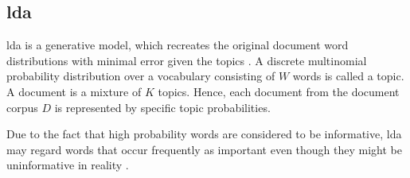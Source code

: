 
\subsection{\ac{lda}}\label{subsec:latent-dirichlet-allocation}

\ac{lda} is a generative model, which recreates the original document word distributions with minimal error given the topics \cite{topic_modeling2015, Top2Vec2020}.
A discrete multinomial probability distribution over a vocabulary consisting of $W$ words is called a topic.
A document is a mixture of $K$ topics.
Hence, each document from the document corpus $D$ is represented by specific topic probabilities.

Due to the fact that high probability words are considered to be informative, \ac{lda} may regard words 
that occur frequently as important even though they might be uninformative in reality \cite{Top2Vec2020}.
